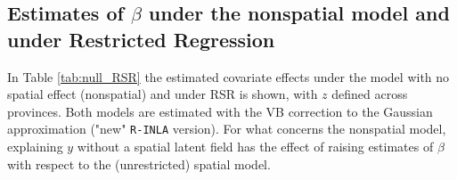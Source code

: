 \documentclass{book}
\begin{document}
\begin{appendices}
\subsection{Estimates of $\beta$ under the nonspatial model and under Restricted Regression} \label{Appendix:null_RSR}

In Table \ref{tab:null_RSR} the estimated covariate effects under the model with no spatial effect (nonspatial) and under RSR is shown, with $z$ defined across provinces. Both models are estimated with the VB correction to the Gaussian approximation ("new" \texttt{R-INLA} version).%
For what concerns the nonspatial model, explaining $y$ without a spatial latent field has the effect of raising estimates of $\beta$ with respect to the (unrestricted) spatial model. 



\end{appendices}
\end{document}

